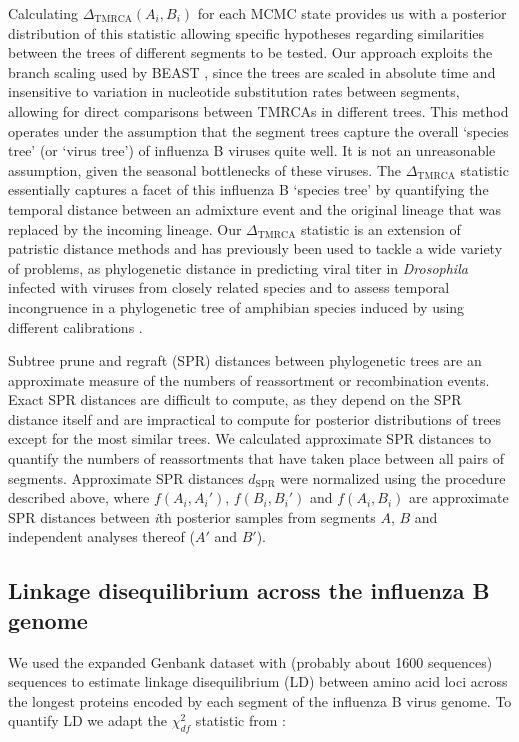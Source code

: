 \documentclass[11pt,oneside,letterpaper]{article}
\newcommand{\chiSq}{\chi^{2}_{df}}
\newcommand{\dtmrca}{\Delta_\mathrm{TMRCA}}
\newcommand{\dspr}{d_\mathrm{SPR}}
\begin{document}
Calculating $\dtmrca(A_i, B_i)$ for each MCMC state provides us with a posterior distribution of this statistic allowing  specific hypotheses regarding similarities between the trees of different segments to be tested.
Our approach exploits the branch scaling used by BEAST \citep{drummond2012}, since the trees are scaled in absolute time and insensitive to variation in nucleotide substitution rates between segments, allowing for direct comparisons between TMRCAs in different trees.
This method operates under the assumption that the segment trees capture the overall `species tree' (or `virus tree') of influenza B viruses quite well.
It is not an unreasonable assumption, given the seasonal bottlenecks of these viruses.
The $\dtmrca$ statistic essentially captures a facet of this influenza B `species tree' by quantifying the temporal distance between an admixture event and the original lineage that was replaced by the incoming lineage.
Our $\dtmrca$ statistic is an extension of patristic distance methods and has previously been used to tackle a wide variety of problems, as phylogenetic distance in predicting viral titer in \textit{Drosophila} infected with viruses from closely related species \citep{longdon2011} and to assess temporal incongruence in a phylogenetic tree of amphibian species induced by using different calibrations \citep{ruane2011}.

Subtree prune and regraft (SPR) distances between phylogenetic trees are an approximate measure of the numbers of reassortment or recombination events.
Exact SPR distances are difficult to compute, as they depend on the SPR distance itself and are impractical to compute for posterior distributions of trees except for the most similar trees.
We calculated approximate SPR distances \citep{whidden2009,whidden2010,whidden2013} to quantify the numbers of reassortments that have taken place between all pairs of segments.
Approximate SPR distances $\dspr$ were normalized using the procedure described above, where $f(A_i, A_i')$, $f(B_i, B_i')$ and $f(A_i, B_i)$ are approximate SPR distances between \textit{i}th posterior samples from segments $A$, $B$ and independent analyses thereof ($A'$ and $B'$).

\subsection*{Linkage disequilibrium across the influenza B genome}
We used the expanded Genbank dataset with (probably about 1600 sequences) sequences to estimate linkage disequilibrium (LD) between amino acid loci across the longest proteins encoded by each segment of the influenza B virus genome.
To quantify LD we adapt the $\chiSq$ statistic from \citep{hedrick1986}:
\end{document}
